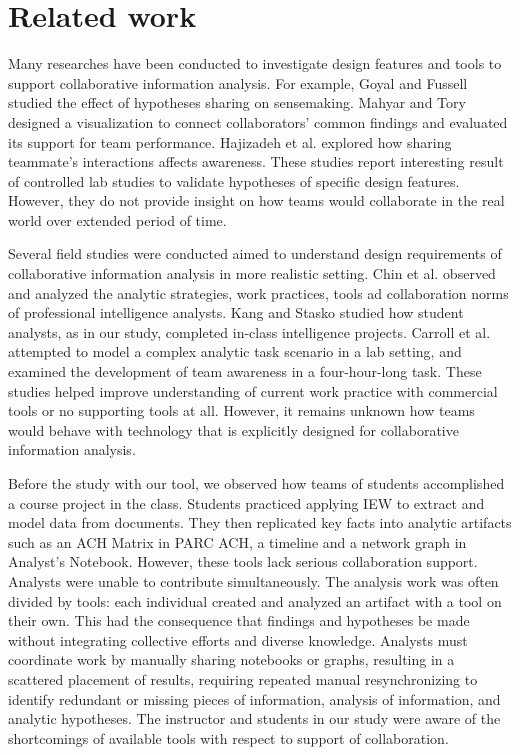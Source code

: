 \section{Related work}\label{related-work}

Many researches have been conducted to investigate design features and
tools to support collaborative information analysis. For example, Goyal
and Fussell \autocite{Goyal2016} studied the effect of hypotheses
sharing on sensemaking. Mahyar and Tory \autocite{Mahyar2013} designed a
visualization to connect collaborators' common findings and evaluated
its support for team performance. Hajizadeh et al.
\autocite{Hajizadeh2013} explored how sharing teammate's interactions
affects awareness. These studies report interesting result of controlled
lab studies to validate hypotheses of specific design features. However,
they do not provide insight on how teams would collaborate in the real
world over extended period of time.

Several field studies were conducted aimed to understand design
requirements of collaborative information analysis in more realistic
setting. Chin et al. \autocite{Chin2009} observed and analyzed the
analytic strategies, work practices, tools ad collaboration norms of
professional intelligence analysts. Kang and Stasko \autocite{Kang2011}
studied how student analysts, as in our study, completed in-class
intelligence projects. Carroll et al. \autocite{Carroll2013} attempted
to model a complex analytic task scenario in a lab setting, and examined
the development of team awareness in a four-hour-long task. These
studies helped improve understanding of current work practice with
commercial tools or no supporting tools at all. However, it remains
unknown how teams would behave with technology that is explicitly
designed for collaborative information analysis.

Before the study with our tool, we observed how teams of students
accomplished a course project in the class. Students practiced applying
IEW to extract and model data from documents. They then replicated key
facts into analytic artifacts such as an ACH Matrix in PARC ACH, a
timeline and a network graph in Analyst's Notebook. However, these tools
lack serious collaboration support. Analysts were unable to contribute
simultaneously. The analysis work was often divided by tools: each
individual created and analyzed an artifact with a tool on their own.
This had the consequence that findings and hypotheses be made without
integrating collective efforts and diverse knowledge. Analysts must
coordinate work by manually sharing notebooks or graphs, resulting in a
scattered placement of results, requiring repeated manual
resynchronizing to identify redundant or missing pieces of information,
analysis of information, and analytic hypotheses. The instructor and
students in our study were aware of the shortcomings of available tools
with respect to support of collaboration.